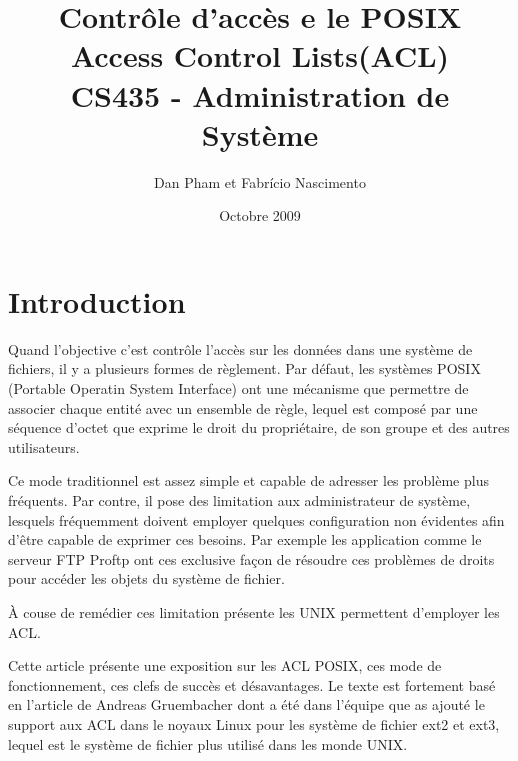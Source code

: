 

\usepackage[francais]{babel}
\usepackage[utf8]{inputenc}

\usepackage{graphicx} 

\usepackage{algorithmic}
\usepackage{algorithm}


\title{\textbf{Contrôle d'accès e le POSIX Access Control Lists(ACL)} \\ CS435 - Administration de Système }
\author{Dan Pham et Fabrício Nascimento}
\date{Octobre 2009}



\maketitle
\newpage
\section*{Introduction}

Quand l'objective c'est contrôle l'accès sur les données dans une système de fichiers, il y a plusieurs formes de règlement. Par défaut, les systèmes POSIX (Portable Operatin System Interface)\cite{ieee1,ieee2} ont une mécanisme que permettre de associer chaque entité avec un ensemble de règle, lequel est composé par une séquence d'octet que exprime le droit du propriétaire, de son groupe et des autres utilisateurs. 

Ce mode traditionnel est assez simple et capable de adresser les problème plus fréquents. Par contre, il pose des limitation aux administrateur de système, lesquels fréquemment doivent employer quelques configuration non évidentes afin d'être capable de exprimer ces besoins. Par exemple les application comme le serveur FTP Proftp\cite{ftp} ont ces exclusive façon de résoudre ces problèmes de droits pour accéder les objets du système de fichier.

À couse de remédier ces limitation présente les UNIX permettent d'employer les ACL.   

Cette article présente une exposition sur les ACL POSIX, ces mode de fonctionnement, ces clefs de succès et désavantages. Le texte est fortement basé en l'article de Andreas Gruembacher\cite{aclsuse} dont a été dans l'équipe que as ajouté le support aux ACL dans le noyaux Linux pour les système de fichier ext2 et ext3, lequel est le système de fichier plus utilisé dans les monde UNIX.


